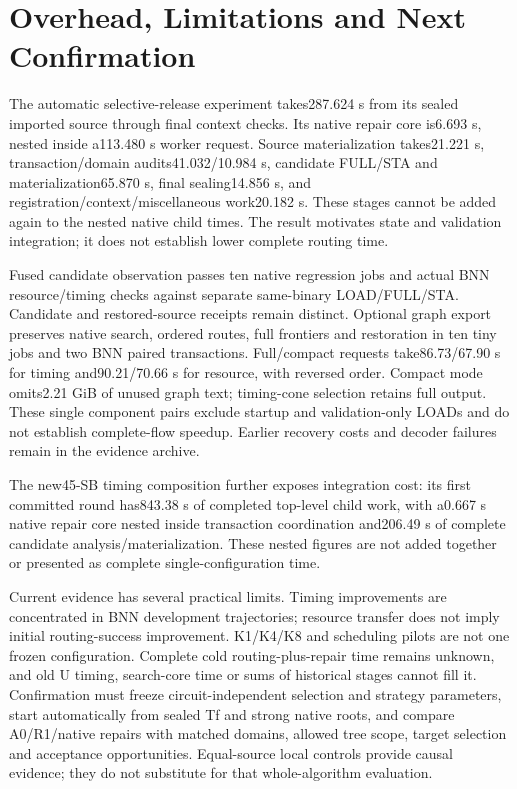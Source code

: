 \documentclass[conference,10pt]{IEEEtran}
\begin{document}
\section{Overhead, Limitations and Next Confirmation}
The automatic selective-release experiment takes287.624 s from its sealed imported source through final context checks. Its native repair core is6.693 s, nested inside a113.480 s worker request. Source materialization takes21.221 s, transaction/domain audits41.032/10.984 s, candidate FULL/STA and materialization65.870 s, final sealing14.856 s, and registration/context/miscellaneous work20.182 s. These stages cannot be added again to the nested native child times. The result motivates state and validation integration; it does not establish lower complete routing time.

Fused candidate observation passes ten native regression jobs and actual BNN resource/timing checks against separate same-binary LOAD/FULL/STA. Candidate and restored-source receipts remain distinct. Optional graph export preserves native search, ordered routes, full frontiers and restoration in ten tiny jobs and two BNN paired transactions. Full/compact requests take86.73/67.90 s for timing and90.21/70.66 s for resource, with reversed order. Compact mode omits2.21 GiB of unused graph text; timing-cone selection retains full output. These single component pairs exclude startup and validation-only LOADs and do not establish complete-flow speedup. Earlier recovery costs and decoder failures remain in the evidence archive.

The new45-SB timing composition further exposes integration cost: its first committed round has843.38 s of completed top-level child work, with a0.667 s native repair core nested inside transaction coordination and206.49 s of complete candidate analysis/materialization. These nested figures are not added together or presented as complete single-configuration time.

Current evidence has several practical limits. Timing improvements are concentrated in BNN development trajectories; resource transfer does not imply initial routing-success improvement. K1/K4/K8 and scheduling pilots are not one frozen configuration. Complete cold routing-plus-repair time remains unknown, and old U timing, search-core time or sums of historical stages cannot fill it. Confirmation must freeze circuit-independent selection and strategy parameters, start automatically from sealed Tf and strong native roots, and compare A0/R1/native repairs with matched domains, allowed tree scope, target selection and acceptance opportunities. Equal-source local controls provide causal evidence; they do not substitute for that whole-algorithm evaluation.
\end{document}
